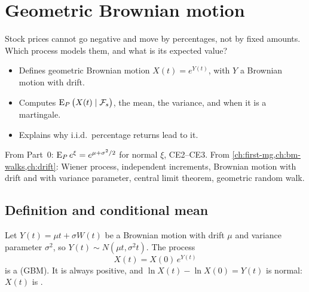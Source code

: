 \chapter{Geometric Brownian motion}
\label{ch:gbm}

\begin{question}
Stock prices cannot go negative and move by percentages, not by fixed amounts. Which process models them, and what is its expected value?
\end{question}

\begin{whatfor}
\begin{itemize}
  \item Defines geometric Brownian motion $X(t)=e^{Y(t)}$, with $Y$ a Brownian motion with drift.
  \item Computes $\operatorname{E}_P\big(X(t)\mid\mathcal F_s\big)$, the mean, the variance, and when it is a martingale.
  \item Explains why i.i.d.\ percentage returns lead to it.
\end{itemize}
\end{whatfor}

\begin{prereq}
From Part~0: $\operatorname{E}_Pe^{\xi}=e^{\mu+\sigma^2/2}$ for normal $\xi$, CE2--CE3. From \cref{ch:first-mg,ch:bm-walks,ch:drift}: Wiener process, independent increments, Brownian motion with drift and with variance parameter, central limit theorem, geometric random walk.
\end{prereq}

\section{Definition and conditional mean}

\begin{definition}
\label{def:gbm}
Let $Y(t)=\mu t+\sigma W(t)$ be a Brownian motion with drift $\mu$ and variance parameter $\sigma^2$, so $Y(t)\sim N(\mu t,\sigma^2t)$. The process
\[
  X(t)=X(0)\,e^{Y(t)}
\]
is a  (GBM). It is always positive, and $\ln X(t)-\ln X(0)=Y(t)$ is normal: $X(t)$ is .
\end{definition}

